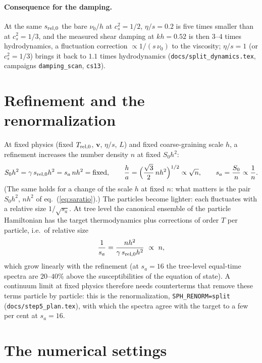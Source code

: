 \documentclass[11pt,aps,preprint,nofootinbib,superscriptaddress,tightenlines]{revtex4-2}
\def\st{\begin{equation}}
\def\stp{\end{equation}}
\def\Eq#1{eq.~(\ref{#1})}
\let\oldparagraph\paragraph
\renewcommand{\paragraph}{\par\bigskip\oldparagraph}
\begin{document}
\paragraph{Consequence for the damping.}  At the same $s_{\rm rel,0}$ the bare $\nu_0/h$ at $c_s^2=1/2$, $\eta/s=0.2$ is five times smaller than
at $c_s^2=1/3$, and the measured shear damping at $kh=0.52$ is then $3$--$4$ times hydrodynamics, a fluctuation correction
$\propto1/(s\,\nu_0)$ to the viscosity; $\eta/s=1$ (or $c_s^2=1/3$) brings it back to $1.1$ times hydrodynamics
(\texttt{docs/split\_dynamics.tex}, campaigns \texttt{damping\_scan}, \texttt{cs13}).

\section{Refinement and the renormalization}
\label{sec:refinement}

At fixed physics (fixed $T_{\rm rel,0}$, $\bm v$, $\eta/s$, $L$) and fixed coarse-graining scale $h$, a refinement increases the number
density $n$ at fixed $S_0h^2$:
\st
S_0h^2=\gamma\,s_{\rm rel,0}h^2=s_a\,nh^2=\text{fixed},\qquad
\frac ha=\Big(\frac{\sqrt3}{2}\,nh^2\Big)^{1/2}\propto\sqrt n,\qquad
s_a=\frac{S_0}{n}\propto\frac1n .
\label{eq:refine}
\stp
(The same holds for a change of the scale $h$ at fixed $n$: what matters is the pair $S_0h^2$, $nh^2$ of \Eq{eq:saratio}.)
The particles become lighter: each fluctuates with a relative size $1/\sqrt{s_a}$.  At tree level the canonical ensemble of the particle
Hamiltonian has the target thermodynamics plus corrections of order $T$ per particle, i.e.\ of relative size
\st
\frac{1}{s_a}=\frac{nh^2}{\gamma\,s_{\rm rel,0}h^2}\ \propto\ n ,
\label{eq:oneloop}
\stp
which grow linearly with the refinement (at $s_a=16$ the tree-level equal-time spectra are $20$--$40\%$ above the susceptibilities of
the equation of state).  A continuum limit at fixed physics therefore needs counterterms that remove these terms particle by particle:
this is the renormalization, \texttt{SPH\_RENORM=split} (\texttt{docs/step5\_plan.tex}), with which the spectra agree with the target to a
few per cent at $s_a=16$.

\section{The numerical settings}
\label{sec:numerics}
\end{document}
